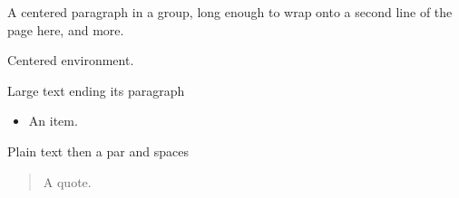 \documentclass{article}
\begin{document}
{\centering A centered paragraph in a group, long enough to wrap onto a second line of the page here, and more.\par}
\begin{center}
Centered environment.
\end{center}

{\large Large text ending its paragraph \quad\par}
\begin{itemize}
\item An item.
\end{itemize}

Plain text then a par and spaces \par
\begin{quote}
A quote.
\end{quote}
\end{document}
